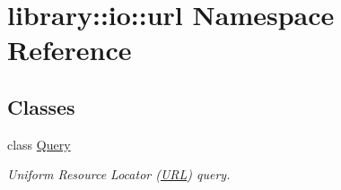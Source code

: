 \hypertarget{namespacelibrary_1_1io_1_1url}{}\section{library\+:\+:io\+:\+:url Namespace Reference}
\label{namespacelibrary_1_1io_1_1url}
\subsection*{Classes}
\begin{DoxyCompactItemize}
\item 
class \hyperlink{classlibrary_1_1io_1_1url_1_1_query}{Query}
\begin{DoxyCompactList}\small\item\em Uniform Resource Locator (\hyperlink{classlibrary_1_1io_1_1_u_r_l}{U\+RL}) query. \end{DoxyCompactList}\end{DoxyCompactItemize}
